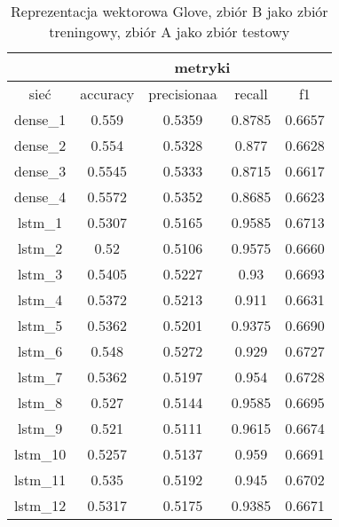 \begin{table}[h] \centering
    \caption{Reprezentacja wektorowa Glove, zbiór B jako zbiór treningowy, zbiór A jako zbiór testowy }
    \label{tab:wyniki_25_eks2}
    \begin{tabular}{|c|c|c|c|c|}
        \hline
                 & \multicolumn{4}{c|}{metryki}                                 \\ \hline
        sieć     & accuracy                     & precisionaa & recall & f1     \\ \hline
        dense\_1 & 0.559                        & 0.5359      & 0.8785 & 0.6657 \\ \hline
        dense\_2 & 0.554                        & 0.5328      & 0.877  & 0.6628 \\ \hline
        dense\_3 & 0.5545                       & 0.5333      & 0.8715 & 0.6617 \\ \hline
        dense\_4 & 0.5572                       & 0.5352      & 0.8685 & 0.6623 \\ \hline
        lstm\_1  & 0.5307                       & 0.5165      & 0.9585 & 0.6713 \\ \hline
        lstm\_2  & 0.52                         & 0.5106      & 0.9575 & 0.6660 \\ \hline
        lstm\_3  & 0.5405                       & 0.5227      & 0.93   & 0.6693 \\ \hline
        lstm\_4  & 0.5372                       & 0.5213      & 0.911  & 0.6631 \\ \hline
        lstm\_5  & 0.5362                       & 0.5201      & 0.9375 & 0.6690 \\ \hline
        lstm\_6  & 0.548                        & 0.5272      & 0.929  & 0.6727 \\ \hline
        lstm\_7  & 0.5362                       & 0.5197      & 0.954  & 0.6728 \\ \hline
        lstm\_8  & 0.527                        & 0.5144      & 0.9585 & 0.6695 \\ \hline
        lstm\_9  & 0.521                        & 0.5111      & 0.9615 & 0.6674 \\ \hline
        lstm\_10 & 0.5257                       & 0.5137      & 0.959  & 0.6691 \\ \hline
        lstm\_11 & 0.535                        & 0.5192      & 0.945  & 0.6702 \\ \hline
        lstm\_12 & 0.5317                       & 0.5175      & 0.9385 & 0.6671 \\ \hline

\end{tabular}
\end{table}
